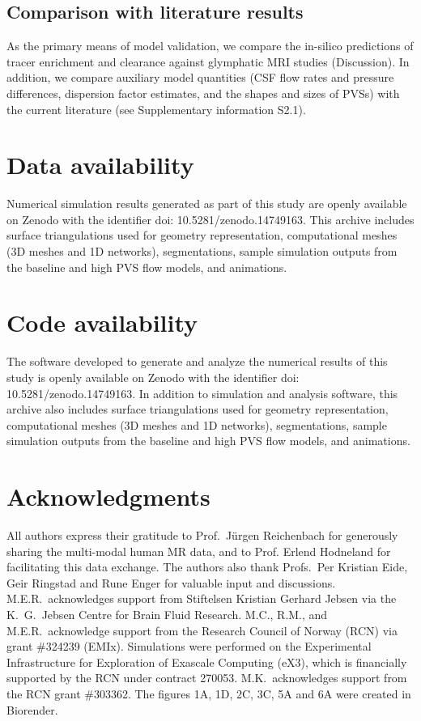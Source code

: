 \documentclass[fleqn,10pt]{wlscirep}
\begin{document}
\subsection*{Comparison with literature results}

As the primary means of model validation, we compare the in-silico
predictions of tracer enrichment and clearance against glymphatic MRI
studies (Discussion). In addition, we compare auxiliary model
quantities (CSF flow rates and pressure differences, dispersion factor
estimates, and the shapes and sizes of PVSs) with the current
literature (see Supplementary information S2.1).

\section*{Data availability}

Numerical simulation results generated as part of this study are
openly available on Zenodo with the identifier doi:
10.5281/zenodo.14749163. This archive includes surface triangulations
used for geometry representation, computational meshes (3D meshes and
1D networks), segmentations, sample simulation outputs from the
baseline and high PVS flow models, and animations.

\section*{Code availability}

The software developed to generate and analyze the numerical results
of this study is openly available on Zenodo with the identifier doi:
10.5281/zenodo.14749163. In addition to simulation and analysis
software, this archive also includes surface triangulations used for
geometry representation, computational meshes (3D meshes and 1D
networks), segmentations, sample simulation outputs from the baseline
and high PVS flow models, and animations. 



\section*{Acknowledgments}

All authors express their gratitude to Prof.~Jürgen Reichenbach for
generously sharing the multi-modal human MR data, and to Prof. Erlend
Hodneland for facilitating this data exchange. The authors also thank
Profs.~Per Kristian Eide, Geir Ringstad and Rune Enger for valuable
input and discussions. M.E.R.~acknowledges support from Stiftelsen
Kristian Gerhard Jebsen via the K.~G.~Jebsen Centre for Brain Fluid
Research. M.C., R.M., and M.E.R.~acknowledge support from the Research
Council of Norway (RCN) via grant \#324239 (EMIx). Simulations were
performed on the Experimental Infrastructure for Exploration of
Exascale Computing (eX3), which is financially supported by the RCN
under contract 270053. M.K.~acknowledges support from the RCN grant
\#303362. The figures 1A, 1D, 2C, 3C, 5A and 6A were created in
Biorender.
\end{document}
